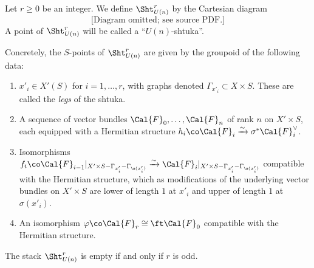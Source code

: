 \begin{defn}
\notready
Let $r \geq 0$ be an integer. We define $\Sht_{U(n)}^{r}$ by the Cartesian diagram
\[
\text{[Diagram omitted; see source PDF.]}
\]
A point of $\Sht_{U(n)}^{r}$ will be called a ``$U(n)$-shtuka''.

Concretely, the $S$-points of $\Sht_{U(n)}^{r}$ are given by the groupoid of the following data:
\begin{enumerate}
\item $x'_i \in X'(S)$ for $i = 1, \ldots, r$, with graphs denoted $\Gamma_{x'_i} \subset X \times S$. These are called the \emph{legs} of the shtuka.
\item A sequence of vector bundles $\Cal{F}_0, \ldots, \Cal{F}_n$ of rank $n$ on $X' \times S$, each equipped with a Hermitian structure $h_i \co \Cal{F}_i \xrightarrow{\sim} \sigma^* \Cal{F}_i^{\vee}$.
\item Isomorphisms $f_i \co \Cal{F}_{i-1}|_{X' \times S - \Gamma_{x'_i} - \Gamma_{\s(x'_i)}} \xrightarrow{\sim} \Cal{F}_i|_{X' \times S - \Gamma_{x'_i}-\Gamma_{\s(x'_i)}}$ compatible with the Hermitian structure, which as modifications of the underlying vector bundles on $X' \times S$ are lower of length $1$ at $x'_i$ and upper of length $1$ at $\sigma(x'_i)$.

\item An isomorphism $\varphi \co \Cal{F}_r \cong \ft \Cal{F}_0$ compatible with the Hermitian structure.
\end{enumerate}
\end{defn}


\begin{lemma}
\notready\label{lem: shtuka empty parity} The stack $\Sht_{U(n)}^r$ is empty if and only if $r$ is odd.
\end{lemma}

